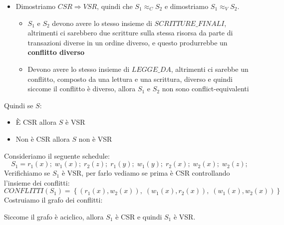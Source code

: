 \documentclass[a4paper]{article}
\begin{document}
\begin{theorem}
\begin{itemize}
\begin{figure}[H]
        \end{figure}

      \item Dimostriamo \( CSR \Rightarrow VSR \), quindi che \( S_1 \approx_C S_2 \) 
        e dimostriamo \( S_1 \approx_V S_2 \).

        \begin{itemize}
          \item 
            \( S_1 \) e \( S_2 \) devono avere lo stesso insieme di \( SCRITTURE\_FINALI \),
            altrimenti ci sarebbero due scritture sulla stessa risorsa da parte
            di transazioni diverse in un ordine diverso, e questo produrrebbe un
            \textbf{ conflitto diverso}

          \item Devono avere lo stesso insieme di \( LEGGE\_DA \), altrimenti ci sarebbe
            un conflitto, composto da una lettura e una scrittura, diverso e quindi
            siccome il conflitto è diverso, allora \( S_1 \) e \( S_2 \) non sono
            conflict-equivalenti
        \end{itemize}
  \end{itemize}
  Quindi se \( S \):
  \begin{itemize}
    \item È CSR allora \( S \) è VSR
    \item Non è CSR allora \( S \) non è VSR
  \end{itemize}
\end{theorem}

\begin{example}
  Consideriamo il seguente schedule:
  \[
    S_1 = r_1(x); \; w_1(x); \; r_2(z); \; r_1(y); \; w_1(y); \; r_2(x); \; w_2(x); \;
    w_2(z);
  \] 
  Verifichiamo se \( S_1 \) è VSR, per farlo vediamo se prima è CSR controllando
  l'insieme dei conflitti:
  \[
    CONFLITTI(S_1) = \left\{ (r_1(x), w_2(x)),\; (w_1(x), r_2(x)),\; (w_1(x), w_2(x)) \right\}
  \] 
  Costruiamo il grafo dei conflitti:
  \begin{figure}[H]
    \centering
  \end{figure}
  \noindent
  Siccome il grafo è aciclico, allora \( S_1 \) è CSR e quindi \( S_1 \) è VSR.
\end{example}
\end{document}
